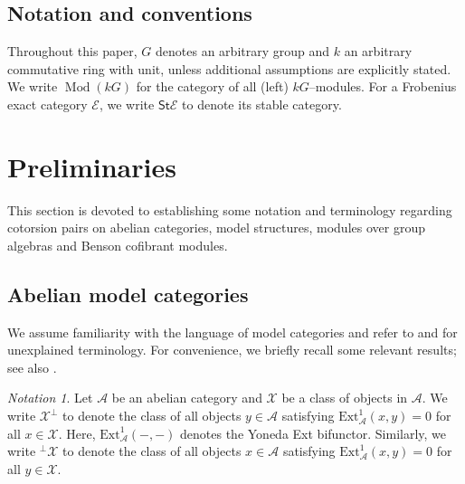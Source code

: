 \documentclass{amsart}
\def \A{{\mathcal A}}
\DeclareMathOperator{\Mod}{Mod}
\numberwithin{equation}{section}%
\theoremstyle{remark}
\newtheorem{notation}[equation]{Notation}
\begin{document}
\subsection*{Notation and conventions} 
Throughout this paper, $G$ denotes an arbitrary group and $k$ an arbitrary commutative ring with unit, unless additional assumptions are explicitly stated. We write $\Mod(kG)$ for the category of all (left) $kG$--modules. For a  Frobenius exact category  $\mathcal{E}$, we write $\mathsf{St}\mathcal{E}$ to denote its stable category.



\section{Preliminaries} \label{sec-prel}


This section is devoted to establishing some notation and terminology regarding cotorsion pairs on abelian categories, model structures, modules over group algebras and Benson cofibrant modules. 

\subsection{Abelian model categories} We assume familiarity with the language of model categories and refer to \cite{Hov99} and \cite{Hov02} for unexplained terminology. For convenience, we briefly recall some relevant results; see also  \cite{Bec14}.

\begin{notation}
    Let $\A$ be an abelian category and $\mathcal{X}$ be a %
    class of objects in $\A$. We write $\mathcal{X}^\perp$ to denote the class of all objects $y\in \A$ satisfying $\mathrm{Ext}^1_\A(x,y)=0$ for all $x\in \mathcal{X}$. %
    Here,  $\mathrm{Ext}^1_\A(-,-)$ denotes the Yoneda Ext bifunctor. Similarly, we write ${}^\perp\mathcal{X}$ to denote the class of all objects $x\in \A$ satisfying $\mathrm{Ext}^1_\A(x,y)=0$ for all $y\in \mathcal{X}$.
\end{notation}
\end{document}
